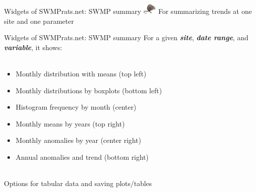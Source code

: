 \documentclass[xcolor=dvipsnames,serif]{beamer}\usepackage[]{graphicx}\usepackage[]{color}
\newcommand{\Bigtxt}[1]{\textbf{\textit{#1}}}
\begin{document}
\begin{frame}{Widgets of SWMPrats.net: SWMP summary}
\includegraphics[width = 0.05\textwidth]{imgs/swmprat.png}  For summarizing trends at one site and one parameter
\centerline{}
\end{frame}

\begin{frame}{Widgets of SWMPrats.net: SWMP summary}
For a given \Bigtxt{site}, \Bigtxt{date range}, and \Bigtxt{variable}, it shows: \\~\\
\begin{itemize}
\item Monthly distribution with means (top left)
\item Monthly distributions by boxplots (bottom left)
\item Histogram frequency by month (center)
\item Monthly means by years (top right)
\item Monthly anomalies by year (center right)
\item Annual anomalies and trend (bottom right) \\~\\
\end{itemize}
Options for tabular data and saving plots/tables
\end{frame}
\end{document}

